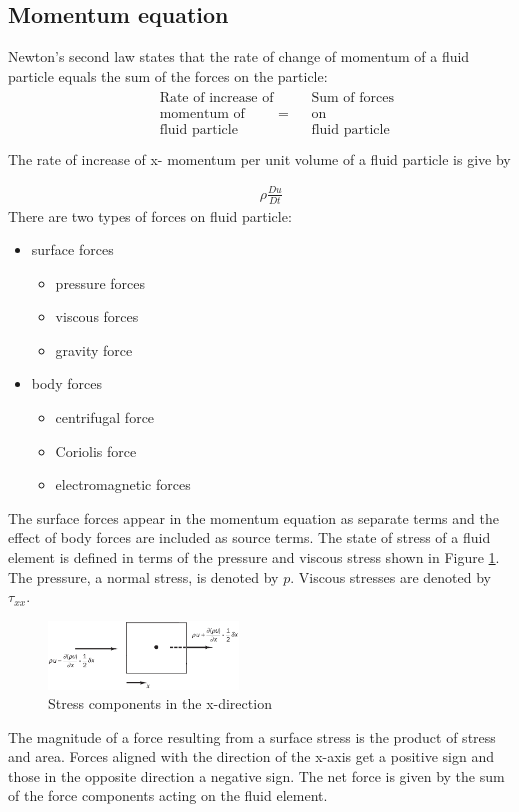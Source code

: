 \subsection{Momentum equation}
Newton's second law states that the rate of change of momentum of a fluid particle equals the sum of the forces on the particle:
\setlength{\jot}{0pt}%
\begin{align*}
&&\boxed{
	\begin{aligned}
	&\text{Rate of increase of}    &&\text{Sum of forces} \nonumber \\
	&\text{momentum of} \hspace{1cm} =  &&\text{on} \nonumber \\
	&\text{fluid particle}	&&\text{fluid particle} \nonumber \\
	\end{aligned}
}
\end{align*}
The rate of increase of x- momentum per unit volume of a fluid particle is give by

\begin{align}
	&&\rho \frac{D u}{Dt}
\end{align}
There are two types of forces on fluid particle:
\begin{itemize}[noitemsep]
	\item surface forces
		\begin{itemize}
			\item pressure forces
			\item viscous forces
			\item gravity force
		\end{itemize}
	\item body forces
		\begin{itemize}
			\item centrifugal force
			\item Coriolis force
			\item electromagnetic forces
		\end{itemize}
\end{itemize}
The surface forces appear in the momentum equation as separate terms and the effect of body forces are included as source terms. The state of stress of a fluid element is defined in terms of the pressure and viscous stress shown in Figure \ref{fig7}. The pressure, a normal stress, is denoted by $p$. Viscous stresses are denoted by $\tau_{xx}$. \\
\begin{figure}[H]
	\centering
	\includegraphics[width =0.45\textwidth]{Images/fig6.png}
	\caption{Stress components in the x-direction \cite{Versteeg2007}}		
	\label{fig7}
\end{figure}
The magnitude of a force resulting from a surface stress is the product of stress and area. Forces aligned with the direction of the x-axis get a positive sign and those in the opposite direction a negative sign. The net force is given by the sum of the force components acting on the fluid element. 

